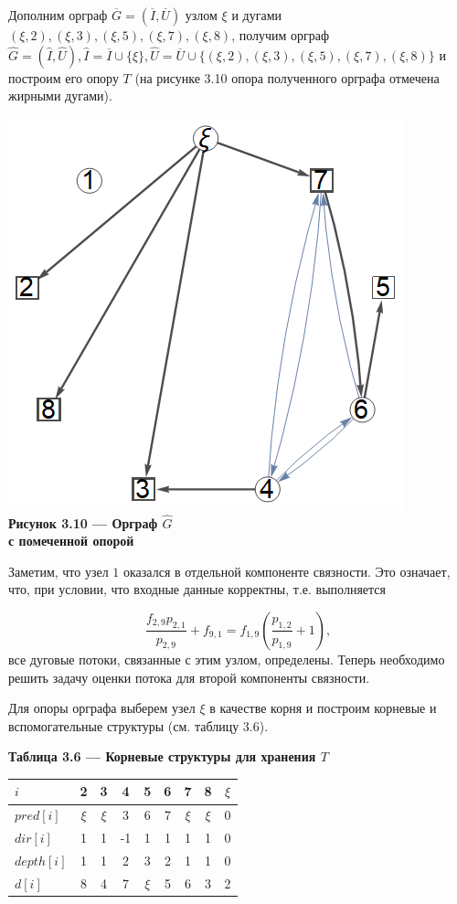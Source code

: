 \documentclass[14pt]{extarticle}%
\begin{document}
Дополним орграф $\overline{G}=(\overline{I},\overline{U})$ узлом $\xi$ и дугами $(\xi,2), (\xi,3),(\xi,5), (\xi,7), (\xi,8)$, получим орграф $\widehat{G}=(\widehat{I}, \widehat{U}), \widehat{I}=\overline{I}\cup \{\xi\}, \widehat{U}=\overline{U}\cup \{(\xi,2), (\xi,3),(\xi,5), (\xi,7), (\xi,8)\}$ и построим его опору $T$ (на рисунке 3.10 опора полученного орграфа отмечена жирными дугами).

\begin{center}
\includegraphics[scale=0.6]{grs/s3ghat.png}\\
\textbf{Рисунок 3.10 --- Орграф $\widehat{G}$ \\с помеченной опорой}
\end{center}

Заметим, что узел $1$ оказался в отдельной компоненте связности. Это означает, что, при условии, что входные данные корректны, т.е. выполняется

$$
\frac{f_{2,9} p_{2,1}}{p_{2,9}}+f_{9,1}=f_{1,9} \left(\frac{p_{1,2}}{p_{1,9}}+1\right),
$$
все дуговые потоки, связанные с этим узлом, определены. Теперь необходимо решить задачу оценки потока для второй компоненты связности.

Для опоры орграфа выберем узел $\xi$ в качестве корня и построим корневые и вспомогательные структуры (см. таблицу 3.6).

\begin{center}
\textbf{Таблица 3.6 --- Корневые структуры для хранения $T$}\\
\begin{tabular}{l|cccccccc}
 $i$ &2&3&4&5&6&7&8&$\xi$\\\hline
 $pred[i]$ & $\xi$ & $\xi$ & 3 & 6 & 7 & $\xi$ & $\xi$ & 0 \\
 $dir[i]$ & 1 & 1 & -1 & 1 & 1 & 1 & 1 & 0 \\
 $depth[i]$ & 1 & 1 & 2 & 3 & 2 & 1 & 1 & 0 \\
 $d[i]$ & 8 & 4 & 7 & $\xi$ & 5 & 6 & 3 & 2  \\
\end{tabular}
\end{center}
\end{document}
